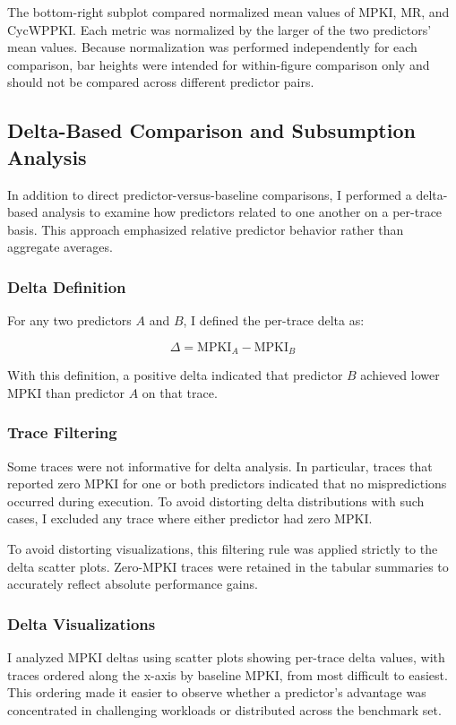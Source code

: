 \documentclass[11pt,a4paper]{article}
\begin{document}
The bottom-right subplot compared normalized mean values of MPKI, MR, and CycWPPKI. Each metric
was normalized by the larger of the two predictors’ mean values. Because normalization was
performed independently for each comparison, bar heights were intended for within-figure
comparison only and should not be compared across different predictor pairs.

\subsection{Delta-Based Comparison and Subsumption Analysis}

In addition to direct predictor-versus-baseline comparisons, I performed a delta-based analysis
to examine how predictors related to one another on a per-trace basis. This approach emphasized
relative predictor behavior rather than aggregate averages.

\subsubsection{Delta Definition}

For any two predictors $A$ and $B$, I defined the per-trace delta as:

\[
\Delta = \text{MPKI}_A - \text{MPKI}_B
\]

With this definition, a positive delta indicated that predictor $B$ achieved lower MPKI than
predictor $A$ on that trace.

\subsubsection{Trace Filtering}

Some traces were not informative for delta analysis. In particular, traces that reported zero
MPKI for one or both predictors indicated that no mispredictions occurred during execution. To
avoid distorting delta distributions with such cases, I excluded any trace where either predictor
had zero MPKI.

To avoid distorting visualizations, this filtering rule was applied strictly to the delta scatter
plots. Zero-MPKI traces were retained in the tabular summaries to accurately reflect absolute
performance gains.

\subsubsection{Delta Visualizations}
I analyzed MPKI deltas using scatter plots showing per-trace delta values, 
with traces ordered along the x-axis by baseline MPKI, from most difficult 
to easiest. This ordering made it easier to observe whether a predictor's 
advantage was concentrated in challenging workloads or distributed across 
the benchmark set.
\end{document}
